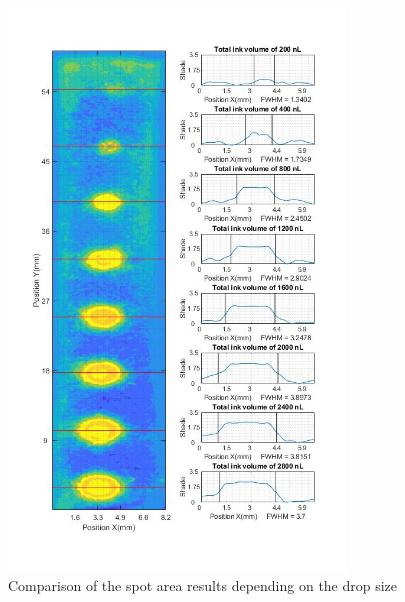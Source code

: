 \begin{figure}[H]
	\centering
	\includegraphics[width=0.8\textwidth]{grafiken/drops50.jpg}
	\caption{Comparison of the spot area results depending on the drop size}
	\label{fig:drops50}
\end{figure} 

\bigskip 

